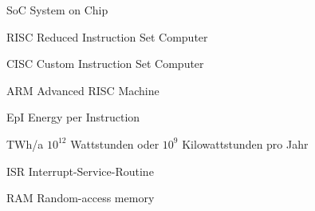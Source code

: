 \begin{abkuerzungen}[MUSTER] %
\item[SoC] System on Chip
\item[RISC] Reduced Instruction Set Computer
\item[CISC] Custom Instruction Set Computer
\item[ARM] Advanced RISC Machine
\item[EpI] Energy per Instruction
\item[TWh/a] $10^{12}$ Wattstunden oder $10^{9}$ Kilowattstunden pro Jahr
\item[ISR] Interrupt-Service-Routine
\item[RAM] Random-access memory


\end{abkuerzungen}
